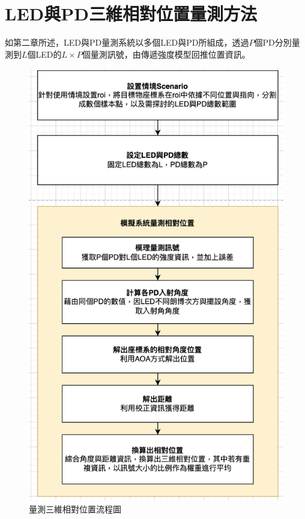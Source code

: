 
\chapter{LED與PD三維相對位置量測方法}
\label{chp:3}

如第二章所述，LED與PD量測系統以多個LED與PD所組成，透過$P$個PD分別量測到$L$個LED的$L\times P$個量測訊號，由傳遞強度模型回推位置資訊。




\begin{figure}[ht]
    \centering
    \includegraphics[width=12cm]{ch3pic/flowchart_pos.png}
    \caption{量測三維相對位置流程圖}
    \label{flow:pos}
\end{figure}
